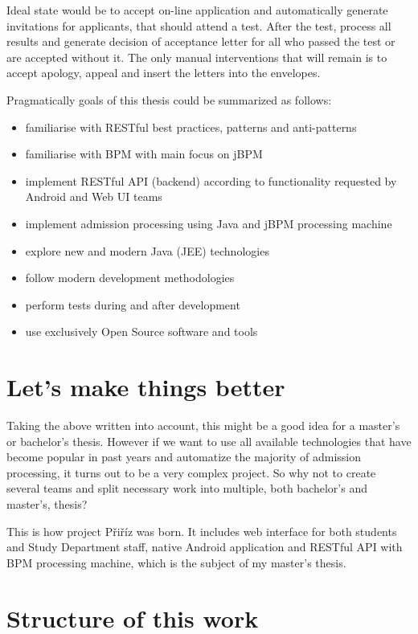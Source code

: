 \begin{introduction}
	Ideal state would be to accept on-line application and automatically generate invitations for applicants, that should
	attend a test. After the test, process all results and generate decision of acceptance letter for all who passed the
	test or are accepted without it. The only manual interventions that will remain is to accept apology, appeal and insert
	the letters into the envelopes.

	Pragmatically goals of this thesis could be summarized as follows:
	
	\begin{itemize}
	  \item familiarise with RESTful best practices, patterns and anti-patterns
	  \item familiarise with BPM with main focus on jBPM
	  \item implement RESTful API (backend) according to functionality requested by Android and Web UI teams
	  \item implement admission processing using Java and jBPM processing machine
	  \item explore new and modern Java (JEE) technologies
	  \item follow modern development methodologies
	  \item perform tests during and after development
	  \item use exclusively Open Source software and tools
	\end{itemize}
	
	\section{Let's make things better}
	
	Taking the above written into account, this might be a good idea for a master's or bachelor's thesis. However if we
	want to use all available technologies that have become popular in past years and automatize the majority of admission
	processing, it turns out to be a very complex project. So why not to create several teams and split necessary work into
	multiple, both bachelor's and master's, thesis?
	
	This is how project Přiříz was born. It includes web interface for both students and Study Department staff, native
	Android application and RESTful API with BPM processing machine, which is the subject of my master's thesis.
	
	\section{Structure of this work}
	

\end{introduction}
